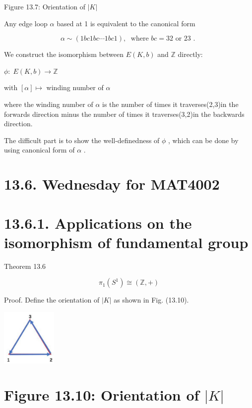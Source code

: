 Figure 13.7: Orientation of \(\left| K\right|\)

Any edge loop \(\alpha\) based at 1 is equivalent to the canonical form

\[
\alpha  \sim  \left( {{1bc1bc}\cdots {1bc1}}\right) ,\;\text{ where }{bc} = {32}\text{ or 23 . }
\]

We construct the isomorphism between \(E\left( {K,b}\right)\) and \(\mathbb{Z}\) directly:

\(\phi  : \;E\left( {K,b}\right)  \rightarrow  \mathbb{Z}\)

with \(\left\lbrack  \alpha \right\rbrack   \mapsto\) winding number of \(\alpha\)

where the winding number of \(\alpha\) is the number of times it traverses(2,3)in the forwards direction minus the number of times it traverses(3,2)in the backwards direction.

The difficult part is to show the well-definedness of \(\phi\) , which can be done by using canonical form of \(\alpha\) .

\section*{13.6. Wednesday for MAT4002}

\section*{13.6.1. Applications on the isomorphism of fundamental group}

Theorem 13.6

\[
{\pi }_{1}\left( {S}^{1}\right)  \cong  \left( {\mathbb{Z}, + }\right)
\]

Proof. Define the orientation of \(\left| K\right|\) as shown in Fig. (13.10).

\begin{center}
\includegraphics[max width=0.2\textwidth]{images/bo_d2bcsrref24c73avs720_137_692_1023_238_246_0.jpg}
\end{center}
\hspace*{3em} 

\section*{Figure 13.10: Orientation of \(\left| K\right|\)}


